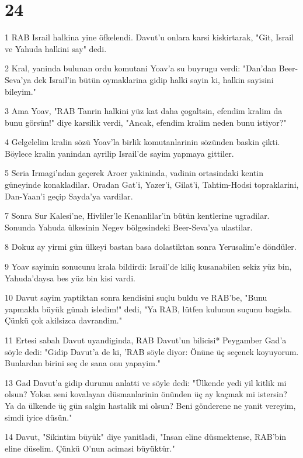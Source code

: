 \chapter{24}

\par 1 RAB Israil halkina yine öfkelendi. Davut'u onlara karsi kiskirtarak, "Git, Israil ve Yahuda halkini say" dedi.
\par 2 Kral, yaninda bulunan ordu komutani Yoav'a su buyrugu verdi: "Dan'dan Beer-Seva'ya dek Israil'in bütün oymaklarina gidip halki sayin ki, halkin sayisini bileyim."
\par 3 Ama Yoav, "RAB Tanrin halkini yüz kat daha çogaltsin, efendim kralim da bunu görsün!" diye karsilik verdi, "Ancak, efendim kralim neden bunu istiyor?"
\par 4 Gelgelelim kralin sözü Yoav'la birlik komutanlarinin sözünden baskin çikti. Böylece kralin yanindan ayrilip Israil'de sayim yapmaya gittiler.
\par 5 Seria Irmagi'ndan geçerek Aroer yakininda, vadinin ortasindaki kentin güneyinde konakladilar. Oradan Gat'i, Yazer'i, Gilat'i, Tahtim-Hodsi topraklarini, Dan-Yaan'i geçip Sayda'ya vardilar.
\par 7 Sonra Sur Kalesi'ne, Hivliler'le Kenanlilar'in bütün kentlerine ugradilar. Sonunda Yahuda ülkesinin Negev bölgesindeki Beer-Seva'ya ulastilar.
\par 8 Dokuz ay yirmi gün ülkeyi bastan basa dolastiktan sonra Yerusalim'e döndüler.
\par 9 Yoav sayimin sonucunu krala bildirdi: Israil'de kiliç kusanabilen sekiz yüz bin, Yahuda'daysa bes yüz bin kisi vardi.
\par 10 Davut sayim yaptiktan sonra kendisini suçlu buldu ve RAB'be, "Bunu yapmakla büyük günah isledim!" dedi, "Ya RAB, lütfen kulunun suçunu bagisla. Çünkü çok akilsizca davrandim."
\par 11 Ertesi sabah Davut uyandiginda, RAB Davut'un bilicisi* Peygamber Gad'a söyle dedi: "Gidip Davut'a de ki, 'RAB söyle diyor: Önüne üç seçenek koyuyorum. Bunlardan birini seç de sana onu yapayim."
\par 13 Gad Davut'a gidip durumu anlatti ve söyle dedi: "Ülkende yedi yil kitlik mi olsun? Yoksa seni kovalayan düsmanlarinin önünden üç ay kaçmak mi istersin? Ya da ülkende üç gün salgin hastalik mi olsun? Beni gönderene ne yanit vereyim, simdi iyice düsün."
\par 14 Davut, "Sikintim büyük" diye yanitladi, "Insan eline düsmektense, RAB'bin eline düselim. Çünkü O'nun acimasi büyüktür."
